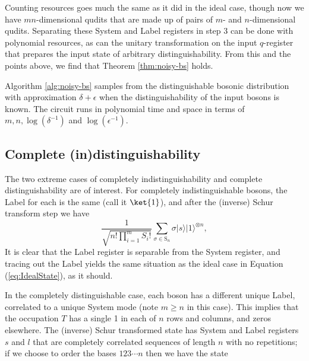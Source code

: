 Counting resources goes much the same as it did in the ideal case, though now we have $mn$-dimensional qudits that are made up of pairs of $m$- and $n$-dimensional qudits.
Separating these System and Label registers in step 3 can be done with polynomial resources, as can the unitary transformation on the input $q$-register that prepares the input state of arbitrary distinguishability.
From this and the points above, we find that Theorem \ref{thm:noisy-bs} holds.
\begin{theorem}
Algorithm \ref{alg:noisy-bs} samples from the distinguishable bosonic distribution with approximation $\delta+\epsilon$ when the distinguishability of the input bosons is known. 
The circuit runs in polynomial time and space in terms of $m, n, \log(\delta^{-1})$ and $\log(\epsilon^{-1})$.
\label{thm:noisy-bs}
\end{theorem}

\subsection{Complete (in)distinguishability}

The two extreme cases of completely indistinguishability and complete distinguishability are of interest.
For completely indistinguishable bosons, the Label for each is the same (call it $\ket{1}$), and after the (inverse) Schur transform step we have
\begin{equation}
\frac{1}{\sqrt{n!\prod_{i=1}^m S_{i}!}}\sum_{\sigma\in \textrm{S}_n}\sigma|s\rangle|1\rangle^{\otimes n},
\end{equation}
It is clear that the Label register is separable from the System register, and tracing out the Label yields the same situation as the ideal case in Equation (\ref{eq:IdealState}), as it should.

In the completely distinguishable case, each boson has a different unique Label, correlated to a unique System mode (note $m\geq n$ in this case).
This implies that the occupation $T$ has a single 1 in each of $n$ rows and columns, and zeros elsewhere.
The (inverse) Schur transformed state has System and Label registers $s$ and $l$ that are completely correlated sequences of length $n$ with no repetitions; if we choose to order the bases $123\cdots n$ then we have the state

